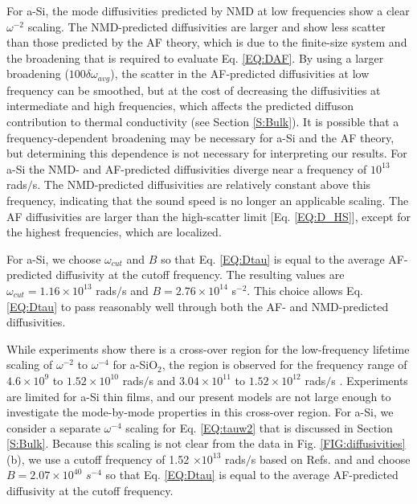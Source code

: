 \documentclass[aps,prb,onecolumn,preprint,superscriptaddress,footinbib,amsmath,amssymb,floatfix]{revtex4}
\begin{document}
For a-Si, the mode diffusivities predicted by NMD at 
low frequencies show a clear $\omega^{-2}$ scaling. 
The NMD-predicted diffusivities are larger and show less 
scatter than those predicted by the AF theory, which is due to 
the finite-size system and the broadening that is 
required to evaluate 
Eq. \eqref{EQ:DAF}.\cite{feldman_thermal_1993} By using a larger 
broadening ($100\delta\omega_{avg}$), the scatter 
in the AF-predicted 
diffusivities at low frequency can be smoothed, but at the cost of 
decreasing the diffusivities at intermediate and 
high frequencies, which 
affects the predicted diffuson contribution to thermal 
conductivity (see Section \ref{S:Bulk}). 
It is possible that a frequency-dependent broadening may be 
necessary for a-Si and the AF theory,  
but determining this dependence is not necessary for 
interpreting our results. 
For a-Si the NMD- and AF-predicted diffusivities diverge 
near a frequency of $10^{13}$ rads$/$s. The NMD-predicted 
diffusivities are relatively constant above this frequency, 
indicating that the sound speed is no longer 
an applicable scaling. The AF diffusivities are 
larger than the high-scatter limit [Eq. \eqref{EQ:D_HS}], 
except for the highest frequencies, which are localized.
\cite{feldman_thermal_1993} 

For a-Si, we choose $\omega_{cut}$  
and $B$ so that Eq. \eqref{EQ:Dtau} is equal 
to the average AF-predicted diffusivity at the cutoff frequency. 
The resulting values are 
$\omega_{cut}=1.16 \times 10^{13}$ rads$/$s 
and $B=2.76\times10^{14}$ s$^{-2}$. This choice 
allows Eq. \eqref{EQ:Dtau} to pass reasonably well through both 
the AF- and NMD-predicted diffusivities. 

While experiments show there is a cross-over region for the 
low-frequency lifetime scaling of $\omega^{-2}$ to 
$\omega^{-4}$ for a-SiO$_2$,
\cite{masciovecchio_evidence_2006,baldi_emergence_2013} 
the region is observed for the frequency range of 
$4.6\times10^9$ to 
$1.52\times10^{10}$ rads$/$s\cite{masciovecchio_evidence_2006} 
and $3.04\times10^{11}$ to $1.52\times10^{12}$ rads$/$s
\cite{baldi_emergence_2013}. 
Experiments are limited for a-Si thin films, 
\cite{hondongwa_ultrasonic_2011} 
and our present models are not 
large enough to investigate the mode-by-mode properties 
in this cross-over region.
For a-Si, we consider a separate $\omega^{-4}$ scaling 
for Eq. \eqref{EQ:tauw2} that is discussed in 
Section \ref{S:Bulk}. Because this scaling is not clear from 
the data in Fig. \ref{FIG:diffusivities} (b),  
we use a cutoff frequency of 1.52 $\times 10^{13}$ rads$/$s  
based on Refs.  and 
and choose $B=2.07\times10^{40}$ $s^{-4}$ so that 
Eq. \eqref{EQ:Dtau} is equal to the average 
AF-predicted diffusivity at the cutoff frequency. 
\end{document}

